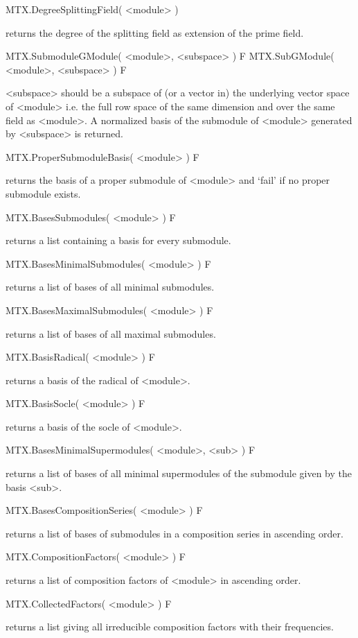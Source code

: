 \>MTX.DegreeSplittingField( <module> )

returns the degree of the splitting field as extension of the prime field.


\>MTX.SubmoduleGModule( <module>, <subspace> ) F
\>MTX.SubGModule( <module>, <subspace> ) F

<subspace> should be a subspace of (or a vector in) the underlying vector
space of <module> i.e. the full row space of the same dimension and over
the same field as <module>. A normalized basis of the submodule of
<module> generated by <subspace> is returned.

\>MTX.ProperSubmoduleBasis( <module> ) F

returns the basis of a proper submodule of <module> and `fail' if no proper
submodule exists.

\>MTX.BasesSubmodules( <module> ) F

returns a list containing a basis for every submodule.

\>MTX.BasesMinimalSubmodules( <module> ) F

returns a list of bases of all minimal submodules.

\>MTX.BasesMaximalSubmodules( <module> ) F

returns a list of bases of all maximal submodules.

\>MTX.BasisRadical( <module> ) F

returns a basis of the radical of <module>.

\>MTX.BasisSocle( <module> ) F

returns a basis of the socle of <module>.

\>MTX.BasesMinimalSupermodules( <module>, <sub> ) F

returns a list of bases of all minimal supermodules of the submodule given by
the basis <sub>.

\>MTX.BasesCompositionSeries( <module> ) F

returns a list of bases of submodules in a composition series in ascending
order.

\>MTX.CompositionFactors( <module> ) F

returns a list of composition factors of <module> in ascending order.

\>MTX.CollectedFactors( <module> ) F

returns a list giving all irreducible composition factors with their
frequencies.

